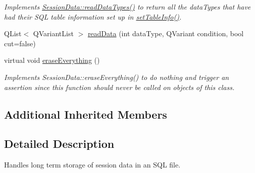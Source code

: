 \begin{DoxyCompactItemize}
\begin{DoxyCompactList}\small\item\em Implements \hyperlink{class_session_data_a4b879f10ecfbfcaa12c2dbbc1b15bdff}{Session\-Data\-::read\-Data\-Types()} to return all the data\-Types that have had their S\-Q\-L table information set up in \hyperlink{class_stored_session_data_a4e05e7d7c7bcffe7d0ab20baac3ff115}{set\-Table\-Info()}. \end{DoxyCompactList}\item 
Q\-List$<$ Q\-Variant\-List $>$ \hyperlink{class_stored_session_data_a5d352c72945a9a5ec4ef9d29c83a283b}{read\-Data} (int data\-Type, Q\-Variant condition, bool cut=false)
\item 
\hypertarget{class_stored_session_data_a46c183f3e894ce39113e67c9bbfdeaa5}{virtual void \hyperlink{class_stored_session_data_a46c183f3e894ce39113e67c9bbfdeaa5}{erase\-Everything} ()}\label{class_stored_session_data_a46c183f3e894ce39113e67c9bbfdeaa5}

\begin{DoxyCompactList}\small\item\em Implements Session\-Data\-::erase\-Everything() to do nothing and trigger an assertion since this function should never be called on objects of this class. \end{DoxyCompactList}\end{DoxyCompactItemize}
\subsection*{Additional Inherited Members}


\subsection{Detailed Description}
Handles long term storage of session data in an S\-Q\-L file. 

